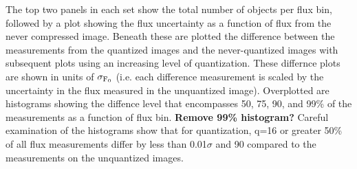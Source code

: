 The top two panels in each set show the total number of objects per flux bin, followed by a plot 
showing the flux uncertainty as a function of flux from the never compressed image.  Beneath these 
are plotted the difference between the measurements from the quantized images and the never-quantized 
images with subsequent plots using an increasing level of quantization.  These differnce 
plots are shown in units of $\sigma_{\rm F_0}$ (i.e. each difference measurement is scaled by the
uncertainty in the flux measured in the unquantized image).  Overplotted are histograms showing the 
diffence level that encompasses 50, 75, 90, and 99\% of the measurements as a function of flux bin.
{\bf Remove 99\% histogram?}
Careful examination of the histograms show that for quantization, q=16 or greater 50\% of all 
flux measurements differ by less than 0.01$\sigma$ and 90%
compared to the measurements on the unquantized images.

